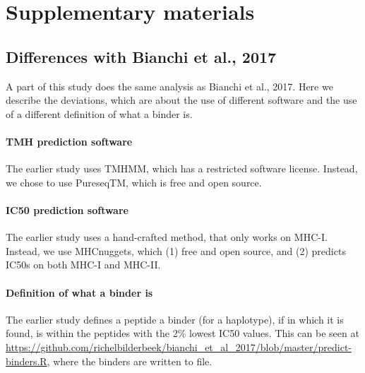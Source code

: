 \appendix
\section{Supplementary materials}

\subsection{Differences with Bianchi et al., 2017}

A part of this study does the same analysis as Bianchi et al., 2017.
Here we describe the deviations, which are about the use of different
software and the use of a different definition of what a binder is.

\paragraph{TMH prediction software}

The earlier study uses TMHMM, which has a restricted software license.
Instead, we chose to use PureseqTM, which is free and open source.



\paragraph{IC50 prediction software}

The earlier study uses a hand-crafted method, that only works on MHC-I.
Instead, we use MHCnuggets, which (1) free and open source, and (2) predicts
IC50s on both MHC-I and MHC-II.

\paragraph{Definition of what a binder is}

The earlier study defines a peptide a binder (for a haplotype), 
if  in which it is found, 
is within the peptides with the 2\% lowest IC50 values.
This can be seen at \url{https://github.com/richelbilderbeek/bianchi_et_al_2017/blob/master/predict-binders.R},
where the binders are written to file.

